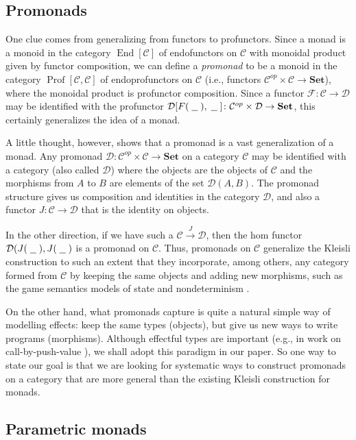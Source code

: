 \documentclass{svproc}
\newcommand\C{\mathcal{C}}
\newcommand\D{\mathcal{D}}
\newcommand\F{\mathcal{F}}
\DeclareMathOperator{\End}{End}
\newcommand*\from{\colon}
\newcommand{\0}{{\mathtt{0}}} \newcommand{\com}{{\mathtt{com}}}
\newcommand{\blank}{\;\underline{\hspace{1.5ex}}\;}
\newcommand{\catname}[1]{\mathbf{#1}}
\newcommand{\Set}{\catname{Set}}
\DeclareMathOperator{\Prof}{Prof}
\begin{document}
\subsection{Promonads}

One clue comes from generalizing from functors to profunctors.  
Since a monad is a monoid in the category $\End[\C]$ of endofunctors on $\C$ with monoidal product given by functor composition, we can define a \emph{promonad} to be a monoid in the category $\Prof[\C,\C]$ of endoprofunctors on $\C$ (i.e., functors $\C^{op}\times\C\to \Set$), where the monoidal product is profunctor composition.
Since a functor $\F\from \C\to \D$ may be identified with the profunctor $\D[F(\blank),\blank]\from\C^{op}\times\D\to\Set$, this certainly generalizes the idea of a monad.  

A little thought, however, shows that a promonad is a vast generalization of a monad.  
Any promonad $\D\from\C^{op}\times\C\to\Set$ on a category $\C$ may be identified \cite{Promonad} with a category (also called $\D$) where the objects are the objects of $\C$ and the morphisms from $A$ to $B$ are elements of the set $\D(A,B)$.  
The promonad structure gives us composition and identities in the category $\D$, and also a functor $J\from \C\to\D$ that is the identity on objects.

In the other direction, if we have such a $\C\xrightarrow{J}\D$, then the hom functor $\D(J(\blank),J(\blank)$ is a promonad on $\C$.  
Thus, promonads on $\C$ generalize the Kleisli construction to such an extent that they incorporate, among others, any category formed from $\C$ by keeping the same objects and adding new morphisms, such as the game semantics models of state \cite{SamsonGuyIAPassive} and nondeterminism \cite{mcCHFiniteND}.  

On the other hand, what promonads capture is quite a natural simple way of modelling effects: keep the same types (objects), but give us new ways to write programs (morphisms).  
Although effectful types are important (e.g., in work on call-by-push-value \cite{Cbpv}), we shall adopt this paradigm in our paper.  
So one way to state our goal is that we are looking for systematic ways to construct promonads on a category that are more general than the existing Kleisli construction for monads.

\subsection{Parametric monads}
\end{document}

